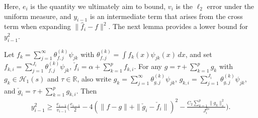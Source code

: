 Here, $e_i$ is the quantity we ultimately aim to bound, $v_i$ is the $\ell_2$ error under the uniform measure, and $y_{i-1}$ is an intermediate term that arises from the cross term when expanding $\|\hat{f}_i - f\|^2$. The next lemma provides a lower bound for $y_{i-1}^2$.
\begin{lemma}\label{lem:general_bound}
Let $f_k = \sum_{j=1}^\infty \theta_{f,j}^{(k)} \psi_{jk}$ with 
$\theta_{f,j}^{(k)} = \int f_k(x)\psi_{jk}(x)\,dx$, and set 
$f_{k,i} = \sum_{j=1}^{J_i} \theta_{f,j}^{(k)}\psi_{jk}$, 
$\check{f}_i = \alpha + \sum_{k=1}^p f_{k,i}$.
For any $g = \tau + \sum_{k=1}^p g_k$ with $g_k \in \mathcal{H}_1(s)$ 
and $\tau \in \mathbb{R}$, also write 
$g_k = \sum_{j=1}^\infty \theta_{g,j}^{(k)} \psi_{jk}$, 
$g_{k,i} = \sum_{j=1}^{J_i} \theta_{g,j}^{(k)}\psi_{jk}$, 
and $\check{g}_i = \tau + \sum_{k=1}^p g_{k,i}$. Then
\begin{align}
y_{i-1}^2
\geq~\frac{e_{i-1}}{v_{i-1}}\Bigg(\frac{e_{i-1}}{2}- 4\left(\|f - g\| + \|\check g_i - \check f_i\|\right)^2 - \frac{C_2\sum_{k=1}^p\|g_k\|_s^2}{J_i^{2s}}\Bigg). \label{ineq:general_bound}
\end{align}
\end{lemma}
